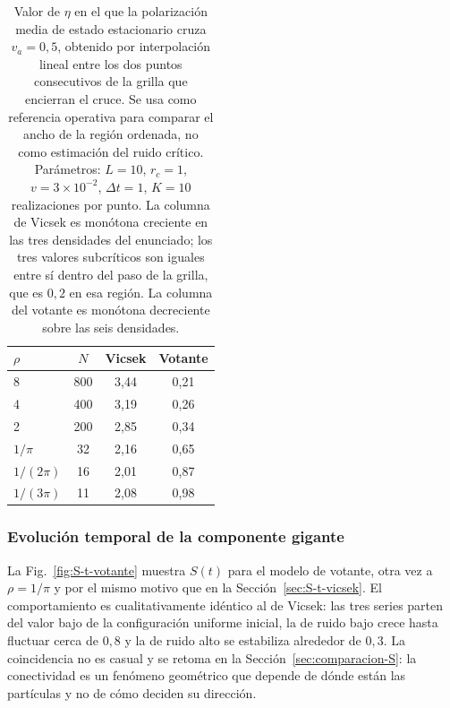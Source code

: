 \documentclass[11pt]{article}
\begin{document}
\begin{table}[htbp]
  \centering
  \caption{Valor de $\eta$ en el que la polarización media de estado
    estacionario cruza $v_a = 0{,}5$, obtenido por interpolación lineal entre
    los dos puntos consecutivos de la grilla que encierran el cruce. Se usa como
    referencia operativa para comparar el ancho de la región ordenada, no como
    estimación del ruido crítico. Parámetros: $L = 10$, $r_c = 1$,
    $v = 3\times10^{-2}$, $\Delta t = 1$, $K = 10$ realizaciones por punto. La
    columna de Vicsek es monótona creciente en las tres densidades del
    enunciado; los tres valores subcríticos son iguales entre sí dentro del paso
    de la grilla, que es $0{,}2$ en esa región. La columna del votante es
    monótona decreciente sobre las seis densidades.}
  \label{tab:cruce}
  \begin{tabular}{lccc}
    \toprule
    $\rho$ & $N$ & Vicsek & Votante \\
    \midrule
    8        & 800 & 3{,}44 & 0{,}21 \\
    4        & 400 & 3{,}19 & 0{,}26 \\
    2        & 200 & 2{,}85 & 0{,}34 \\
    \midrule
    $1/\pi$    & \phantom{0}32 & 2{,}16 & 0{,}65 \\
    $1/(2\pi)$ & \phantom{0}16 & 2{,}01 & 0{,}87 \\
    $1/(3\pi)$ & \phantom{0}11 & 2{,}08 & 0{,}98 \\
    \bottomrule
  \end{tabular}
\end{table}

\subsubsection{Evolución temporal de la componente gigante}
\label{sec:S-t-votante}

La Fig.~\ref{fig:S-t-votante} muestra $S(t)$ para el modelo de votante, otra vez
a $\rho = 1/\pi$ y por el mismo motivo que en la Sección~\ref{sec:S-t-vicsek}. El
comportamiento es cualitativamente idéntico al de Vicsek: las tres series parten
del valor bajo de la configuración uniforme inicial, la de ruido bajo crece
hasta fluctuar cerca de $0{,}8$ y la de ruido alto se estabiliza alrededor de
$0{,}3$. La coincidencia no es casual y se retoma en la
Sección~\ref{sec:comparacion-S}: la conectividad es un fenómeno geométrico que
depende de dónde están las partículas y no de cómo deciden su dirección.
\end{document}
